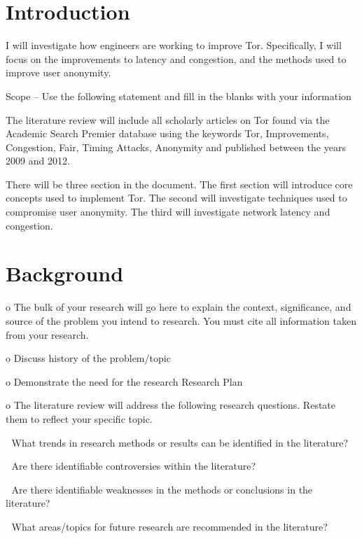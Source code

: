 \documentclass[letterpaper,11pt]{texMemo}
\begin{document}
\maketitle

\section{Introduction}

I will investigate how engineers are working to improve Tor. Specifically, I will focus on the
improvements to latency and congestion, and the methods used to improve user anonymity.

Scope – Use the following statement and fill in the blanks with your
information

    The literature review will include all scholarly articles on Tor found via the Academic Search
    Premier database using the keywords Tor, Improvements, Congestion, Fair, Timing Attacks,
    Anonymity and published between the years 2009 and 2012.

    There will be three section in the document. The first section will introduce core concepts used
    to implement Tor. The second will investigate techniques used to compromise user
    anonymity. The third will investigate network latency and congestion.

\section{Background}

    o The bulk of your research will go here to explain the context, significance,
    and source of the problem you intend to research. You must cite all
    information taken from your research.
    

    o Discuss history of the problem/topic

    o Demonstrate the need for the research
    Research Plan

    o The literature review will address the following research questions. Restate
    them to reflect your specific topic.

         What trends in research methods or results can be identified in the
        literature?

         Are there identifiable controversies within the literature?

         Are there identifiable weaknesses in the methods or conclusions in the
        literature?

         What areas/topics for future research are recommended in the
        literature?
\end{document}
